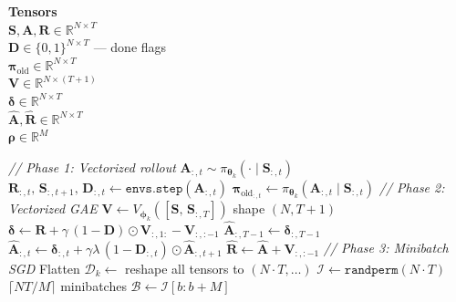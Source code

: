\documentclass[11pt]{article}
\begin{document}
\begin{algorithm}[p]
\begin{minipage}[t]{0.28\linewidth}
\vspace{6pt}
\textbf{Tensors} \\[2pt]
$\mathbf{S}, \mathbf{A}, \mathbf{R} \in \mathbb{R}^{N \times T}$ \\
$\mathbf{D} \in \{0,1\}^{N \times T}$ --- done flags \\
$\boldsymbol{\pi}_{\text{old}} \in \mathbb{R}^{N \times T}$ \\
$\mathbf{V} \in \mathbb{R}^{N \times (T+1)}$ \\
$\boldsymbol{\delta} \in \mathbb{R}^{N \times T}$ \\
$\hat{\mathbf{A}}, \hat{\mathbf{R}} \in \mathbb{R}^{N \times T}$ \\
$\boldsymbol{\rho} \in \mathbb{R}^{M}$
\end{minipage}%
\hfill
\vrule
\hfill
\begin{minipage}[t]{0.68\linewidth}
\begin{algorithmic}[1]
    \Statex \hspace{\algorithmicindent}\textit{// Phase 1: Vectorized rollout}
        \State $\mathbf{A}_{:,t} \sim \pi_{\boldsymbol{\theta}_k}(\cdot \mid \mathbf{S}_{:,t})$
        \State $\mathbf{R}_{:,t},\, \mathbf{S}_{:,t+1},\, \mathbf{D}_{:,t} \gets \texttt{envs.step}(\mathbf{A}_{:,t})$
        \State $\boldsymbol{\pi}_{\text{old}_{:,t}} \gets \pi_{\boldsymbol{\theta}_k}(\mathbf{A}_{:,t} \mid \mathbf{S}_{:,t})$
    \EndFor
    \Statex \hspace{\algorithmicindent}\textit{// Phase 2: Vectorized GAE}
    \State $\mathbf{V} \gets V_{\boldsymbol{\phi}_k}([\mathbf{S},\, \mathbf{S}_{:,T}])$ \hfill shape $(N, T{+}1)$
    \State $\boldsymbol{\delta} \gets \mathbf{R} + \gamma\,(1 - \mathbf{D}) \odot \mathbf{V}_{:,1:} - \mathbf{V}_{:,:-1}$
    \State $\hat{\mathbf{A}}_{:,T-1} \gets \boldsymbol{\delta}_{:,T-1}$
        \State $\hat{\mathbf{A}}_{:,t} \gets \boldsymbol{\delta}_{:,t} + \gamma \lambda\,(1 - \mathbf{D}_{:,t}) \odot \hat{\mathbf{A}}_{:,t+1}$
    \EndFor
    \State $\hat{\mathbf{R}} \gets \hat{\mathbf{A}} + \mathbf{V}_{:,:-1}$
    \Statex \hspace{\algorithmicindent}\textit{// Phase 3: Minibatch SGD}
    \State Flatten $\mathcal{D}_k \gets$ reshape all tensors to $(N \!\cdot\! T, \ldots)$
        \State $\mathcal{I} \gets \texttt{randperm}(N \!\cdot\! T)$
         \hfill $\lceil NT/M \rceil$ minibatches
            \State $\mathcal{B} \gets \mathcal{I}[b : b{+}M]$

\end{algorithmic}
\end{minipage}
\end{algorithm}
\end{document}
